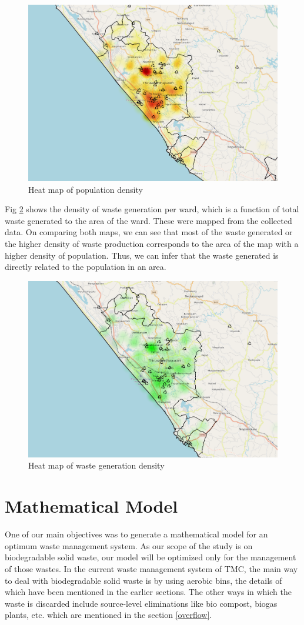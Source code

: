\documentclass[12pt,a4paper]{report}
\begin{document}
\begin{figure}[H]
	\centering
	\includegraphics[width=0.6\linewidth]{popdens}
	\caption{Heat map of population density}
	\label{fig:popdens}
\end{figure}

Fig \ref{fig:wastedens} shows the density of waste generation per ward, which is a function of total waste generated to the area of the ward. These were mapped from the collected data. On comparing both maps, we can see that most of the waste generated or the higher density of waste production corresponds to the area of the map with a higher density of population. Thus, we can infer that the waste generated is directly related to the population in an area.

\begin{figure}[H]
	\centering
	\includegraphics[width=0.6\linewidth]{wastedens}
	\caption{Heat map of waste generation density}
	\label{fig:wastedens}
\end{figure}

\chapter{\textbf{Mathematical Model}}
One of our main objectives was to generate a mathematical model for an optimum waste management system. As our scope of the study is on biodegradable solid waste, our model will be optimized only for the management of those wastes. In the current waste management system of TMC, the main way to deal with biodegradable solid waste is by using aerobic bins, the details of which have been mentioned in the earlier sections. The other ways in which the waste is discarded include source-level eliminations like bio compost, biogas plants, etc. which are mentioned in the section \ref{overflow}.
\end{document}

